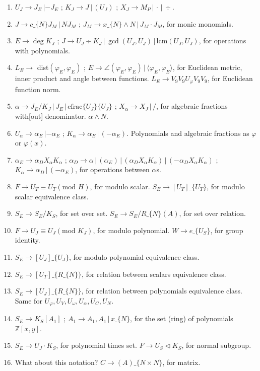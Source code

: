 \documentclass[11pt,a4paper]{article}
\newenvironment{myenum}
{ \begin{enumerate}
    \setlength{\itemsep}{0pt}
    \setlength{\parskip}{0pt}
    \setlength{\parsep}{0pt}     }
{ \end{enumerate}                  }
\begin{document}
\begin{myenum}
		\item $U_J \rightarrow J_E\,| -J_E$ ; $K_J \rightarrow J\,|\,(U_J)$ ; $X_J \rightarrow M_P\,|\,\cdot\,|\,\div$.
		\item $J \rightarrow c\_\{N\} J_M\,|\,N J_M$ ; $J_M \rightarrow x\_\{N\}\wedge N\,|\,J_M\cdot J_M$, for monic monomials.
		\item $E \rightarrow \deg K_J$ ; $J \rightarrow U_J \div K_J\,|\,\gcd(U_J, U_J)\,|\,\text{lcm}(U_J, U_J)$, for operations with polynomials.
		\item $L_E \rightarrow$ dist$(\varphi_E, \varphi_E)$ ; $E \rightarrow \angle(\varphi_E,\varphi_E)\,|\,\langle \varphi_E, \varphi_E \rangle$, for Euclidean metric, inner product and angle between functions. $L_E \rightarrow V_9V_9U_\varphi V_9V_9$, for Euclidean function norm.
		\item $\alpha \rightarrow J_E/K_J\,|\,J_E\,|\,\text{cfrac}\{U_J\}\{U_J\}$ ; $X_\alpha \rightarrow X_J\,|\,/$, for algebraic fractions with[out] denominator. $\alpha\wedge N$.
		\item $U_\alpha \rightarrow \alpha_E\,| -\alpha_E$ ; $K_\alpha \rightarrow \alpha_E\,|\,(-\alpha_E)$. Polynomials and algebraic fractions as $\varphi$ or $\varphi(x)$.
		\item $\alpha_E \rightarrow \alpha_D X_\alpha K_\alpha$ ; $\alpha_D \rightarrow \alpha\,|\,(\alpha_E)\,|\,(\alpha_D X_\alpha K_\alpha)\,|\,(-\alpha_D X_\alpha K_\alpha)$ ; $K_\alpha \rightarrow \alpha_D\,|\,(-\alpha_E)$, for operations between $\alpha$s.
		\item $F \rightarrow U_T \equiv U_T (\text{mod }H)$, for modulo scalar. $S_E \rightarrow [U_T]\_\{U_T\}$, for modulo scalar equivalence class.
		\item $S_E \rightarrow S_E / K_S$, for set over set. $S_E \rightarrow S_E / R\_\{N\} (A)$, for set over relation.
		\item $F \rightarrow U_J \equiv U_J (\text{mod }K_J)$, for modulo polynomial. $W \rightarrow e\_\{U_S\}$, for group identity.
		\item $S_E \rightarrow [U_J]\_\{U_J\}$, for modulo polynomial equivalence class.
		\item $S_E \rightarrow [U_T]\_\{R\_\{N\}\}$, for relation between scalars equivalence class.
		\item $S_E \rightarrow [U_J]\_\{R\_\{N\}\}$, for relation between polynomials equivalence class. Same for $U_\varphi, U_V, U_\omega, U_\alpha, U_C, U_N$.
		\item $S_E \rightarrow K_S[A_1]$ ; $A_1 \rightarrow A_1, A_1\,|\,x\_\{N\}$, for the set (ring) of polynomials $\mathbb{Z}[x,y]$.
		\item $S_E \rightarrow U_J \cdot K_S$, for polynomial times set. $F \rightarrow U_S \lhd K_S$, for normal subgroup.
		\item What about this notation? $C \rightarrow (A)\_\{N \times N\}$, for matrix.


\end{myenum}
\end{document}
